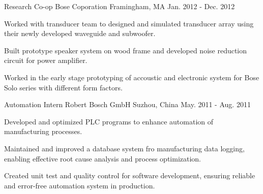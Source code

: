 \begin{cventries}
	\cventry
		{Research Co-op} %
		{Bose Coporation} %
		{Framingham, MA} %
		{Jan. 2012 - Dec. 2012} %
		{
			\begin{cvitems} %
				\item {Worked with transducer team to designed and simulated transducer array %
				using their newly developed waveguide and subwoofer.}
				\item {Built prototype speaker system on wood frame and developed noise %
				reduction circuit for power amplifier.}
				\item {Worked in the early stage prototyping of accoustic and electronic system %
				for Bose Solo series with different form factors.}
			\end{cvitems}
		}

	\cventry
		{Automation Intern} %
		{Robert Bosch GmbH} %
		{Suzhou, China} %
		{May. 2011 - Aug. 2011} %
		{
			\begin{cvitems} %
				\item {Developed and optimized PLC programs to enhance automation of %
				manufacturing processes}.
				\item {Maintained and improved a database system fro manufacturing data %
				logging, enabling effective root cause analysis and process optimization.}
				\item {Created unit test and quality control for software development, %
				ensuring reliable and error-free automation system in production.}
			\end{cvitems}
		}

\end{cventries}
